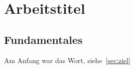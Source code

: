

\section{Arbeitstitel}

\subsection{Fundamentales}
Am Anfang war das Wort, siehe~\ref{sec:ziel}%


\clearpage